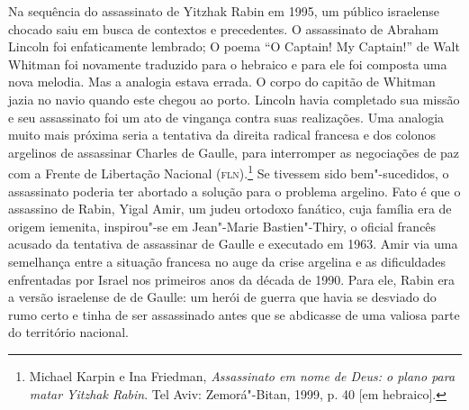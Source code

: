 Na sequência do assassinato de Yitzhak Rabin em 1995, um público
israelense chocado saiu em busca de contextos e precedentes. O
assassinato de Abraham Lincoln foi enfaticamente lembrado; O poema ``O
Captain! My Captain!'' de Walt Whitman foi novamente traduzido para o
hebraico e para ele foi composta uma nova melodia. Mas a analogia estava
errada. O corpo do capitão de Whitman jazia no navio quando este chegou
ao porto. Lincoln havia completado sua missão e seu assassinato foi um
ato de vingança contra suas realizações. Uma analogia muito mais próxima
seria a tentativa da direita radical francesa e dos colonos argelinos de
assassinar Charles de Gaulle, para interromper as negociações de paz com
a Frente de Libertação Nacional (\textsc{fln}).\footnote{Michael Karpin e Ina Friedman, \textit{Assassinato em nome de Deus: o plano para matar
Yitzhak Rabin}. Tel Aviv: Zemorá"-Bitan, 1999, p. 40 {[}em hebraico{]}.} Se tivessem sido bem"-sucedidos,
o assassinato poderia ter abortado a solução para o problema
argelino. Fato é que o assassino de Rabin, Yigal Amir, um judeu ortodoxo
fanático, cuja família era de origem iemenita, inspirou"-se em Jean"-Marie
Bastien"-Thiry, o oficial francês acusado da tentativa de assassinar de Gaulle e executado em 1963. 
Amir via uma semelhança entre a situação
francesa no auge da crise argelina e as dificuldades enfrentadas por
Israel nos primeiros anos da década de 1990. Para ele, Rabin era a
versão israelense de de Gaulle: um herói de guerra que havia se desviado
do rumo certo e tinha de ser assassinado antes que se abdicasse de uma
valiosa parte do território nacional.

